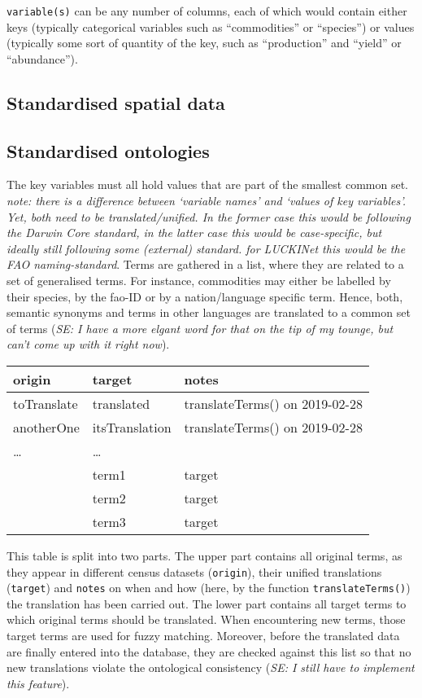 \documentclass[12pt,]{article}
\begin{document}
\texttt{variable(s)} can be any number of columns, each of which would contain either keys (typically categorical variables such as ``commodities'' or ``species'') or values (typically some sort of quantity of the key, such as ``production'' and ``yield'' or ``abundance'').

\hypertarget{standardised-spatial-data}{%
\subsection{Standardised spatial data}\label{standardised-spatial-data}}

\hypertarget{standardised-ontologies}{%
\subsection{Standardised ontologies}\label{standardised-ontologies}}

The key variables must all hold values that are part of the smallest common set.
\emph{note: there is a difference between `variable names' and `values of key variables'. Yet, both need to be translated/unified. In the former case this would be following the Darwin Core standard, in the latter case this would be case-specific, but ideally still following some (external) standard. for LUCKINet this would be the FAO naming-standard}.
Terms are gathered in a list, where they are related to a set of generalised terms.
For instance, commodities may either be labelled by their species, by the fao-ID or by a nation/language specific term.
Hence, both, semantic synonyms and terms in other languages are translated to a common set of terms (\emph{SE: I have a more elgant word for that on the tip of my tounge, but can't come up with it right now}).

\begin{longtable}[]{@{}lll@{}}
\toprule
origin & target & notes\tabularnewline
\midrule
\endhead
toTranslate & translated & translateTerms() on 2019-02-28\tabularnewline
anotherOne & itsTranslation & translateTerms() on 2019-02-28\tabularnewline
\ldots{} & \ldots{} &\tabularnewline
& term1 & target\tabularnewline
& term2 & target\tabularnewline
& term3 & target\tabularnewline
\bottomrule
\end{longtable}

This table is split into two parts. The upper part contains all original terms, as they appear in different census datasets (\texttt{origin}), their unified translations (\texttt{target}) and \texttt{notes} on when and how (here, by the function \texttt{translateTerms()}) the translation has been carried out.
The lower part contains all target terms to which original terms should be translated. When encountering new terms, those target terms are used for fuzzy matching.
Moreover, before the translated data are finally entered into the database, they are checked against this list so that no new translations violate the ontological consistency (\emph{SE: I still have to implement this feature}).
\end{document}
